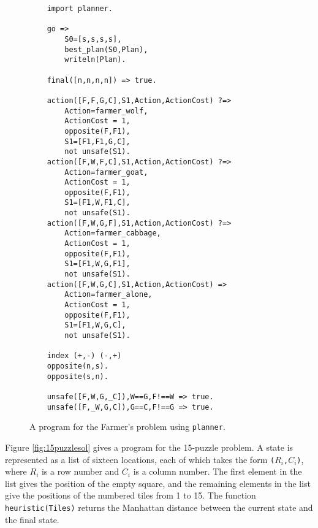 \begin{figure}
\begin{center}
\begin{verbatim}
    import planner.

    go =>
        S0=[s,s,s,s],
        best_plan(S0,Plan),
        writeln(Plan).

    final([n,n,n,n]) => true.

    action([F,F,G,C],S1,Action,ActionCost) ?=>
        Action=farmer_wolf,
        ActionCost = 1,        
        opposite(F,F1),
        S1=[F1,F1,G,C],
        not unsafe(S1).
    action([F,W,F,C],S1,Action,ActionCost) ?=>
        Action=farmer_goat,
        ActionCost = 1,        
        opposite(F,F1),
        S1=[F1,W,F1,C],
        not unsafe(S1).
    action([F,W,G,F],S1,Action,ActionCost) ?=>
        Action=farmer_cabbage,
        ActionCost = 1,        
        opposite(F,F1),
        S1=[F1,W,G,F1],
        not unsafe(S1).
    action([F,W,G,C],S1,Action,ActionCost) =>
        Action=farmer_alone,
        ActionCost = 1,        
        opposite(F,F1),
        S1=[F1,W,G,C],
        not unsafe(S1).

    index (+,-) (-,+)
    opposite(n,s).
    opposite(s,n).

    unsafe([F,W,G,_C]),W==G,F!==W => true.
    unsafe([F,_W,G,C]),G==C,F!==G => true.
\end{verbatim}
\end{center}
\caption{\label{fig:farmer2}A program for the Farmer's problem using \texttt{planner}.}
\end{figure}

Figure \ref{fig:15puzzlesol} gives a program for the 15-puzzle problem. A state is represented as a list of sixteen locations, each of which takes the form \texttt{($R_i$,$C_i$)}, where $R_i$ is a row number and $C_i$ is a column number. The first element in the list gives the position of the empty square, and the remaining elements in the list give the positions of the numbered tiles from 1 to 15. The function \texttt{heuristic(Tiles)} returns the Manhattan distance between the current state and the final state.

